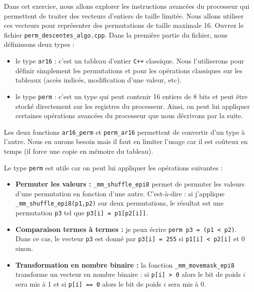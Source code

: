 \documentclass{cours}
\newcommand{\lsti}[1]{\lstinline{#1}{}}
\begin{document}
\begin{exercice}
\label{exo:proc}

Dans cet exercice, nous allons explorer les instructions avancées du processeur qui permettent de traiter des vecteurs d'entiers de taille limitée. 
Nous allons utiliser ces vecteurs pour représenter des permutations de taille maximale 16. Ouvrez le fichier \lsti{perm_descentes_algo.cpp}. Dans la première partie du fichier, nous définissons deux types :

\begin{itemize}
\item le type \lsti{ar16} : c'est un tableau d'entier \lsti{C++} classique. Nous l'utiliserons pour définir simplement les permutations et pour les opérations classiques sur les tableaux (accès indicés, modification d'une valeur, etc).

\item le type \lsti{perm} : c'est un type qui peut contenir 16 entiers de 8 bits et peut être stocké directement sur les registres du processeur. Ainsi, on peut lui appliquer certaines opérations avancées du processeur que nous décrivons par la suite.
\end{itemize}

Les deux fonctions \lsti{ar16_perm} et \lsti{perm_ar16} permettent de convertir d'un type à l'autre. Nous en aurons besoin mais il faut en limiter l'usage car il est coûteux en temps (il force une copie en mémoire du tableau).

Le type \lsti{perm} est utile car on peut lui appliquer les opérations suivantes :

\begin{itemize}
\item \textbf{Permuter les valeurs : } \lsti{_mm_shuffle_epi8} permet de permuter les valeurs d'une permutation en fonction d'une autre. C'est-à-dire : si j'applique \lsti{_mm_shuffle_epi8(p1,p2)} sur deux permutations, le résultat est une permutation \lsti{p3} tel que \lsti{p3[i] = p1[p2[i]]}.

\item \textbf{Comparaison termes à termes : } je peux écrire \lsti{perm p3 = (p1 < p2)}. Dans ce cas, le vecteur \lsti{p3} est donné par \lsti{p3[i] = 255} si \lsti{p1[i] < p2[i]} et 0 sinon. 

\item \textbf{Transformation en nombre binaire : } la fonction \lsti{_mm_movemask_epi8} transforme un vecteur en nombre binaire :  si \lsti{p[i] > 0} alors le bit de poids $i$ sera mis à 1 et si \lsti{p[i] == 0} alors le bit de poids $i$ sera mis à 0.  
\end{itemize}


\end{exercice}
\end{document}
